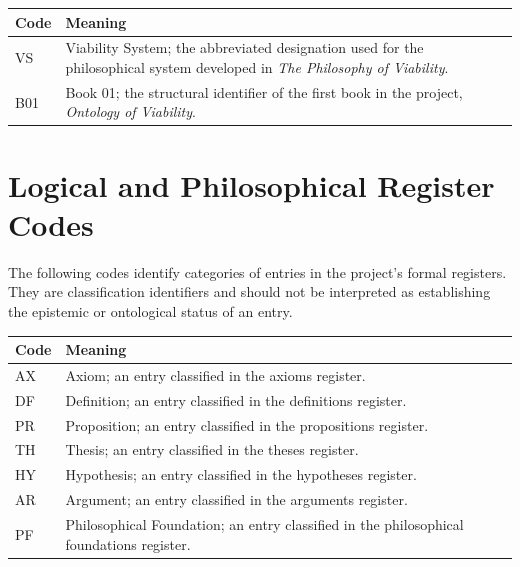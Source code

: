 \begin{center}
\begin{tabular}{|p{}|p{}|}
\hline
\textbf{Code} & \textbf{Meaning} \\
\hline

VS
&
Viability System; the abbreviated designation used for the
philosophical system developed in
\textit{The Philosophy of Viability}.
\\
\hline

B01
&
Book 01; the structural identifier of the first book in the
project, \textit{Ontology of Viability}.
\\
\hline

\end{tabular}
\end{center}



\section*{Logical and Philosophical Register Codes}

The following codes identify categories of entries in the project's
formal registers. They are classification identifiers and should not
be interpreted as establishing the epistemic or ontological status
of an entry.

\begin{center}
\begin{tabular}{|p{}|p{}|}
\hline
\textbf{Code} & \textbf{Meaning} \\
\hline

AX
&
Axiom; an entry classified in the axioms register.
\\
\hline

DF
&
Definition; an entry classified in the definitions register.
\\
\hline

PR
&
Proposition; an entry classified in the propositions register.
\\
\hline

TH
&
Thesis; an entry classified in the theses register.
\\
\hline

HY
&
Hypothesis; an entry classified in the hypotheses register.
\\
\hline

AR
&
Argument; an entry classified in the arguments register.
\\
\hline

PF
&
Philosophical Foundation; an entry classified in the
philosophical foundations register.
\\
\hline

\end{tabular}
\end{center}


